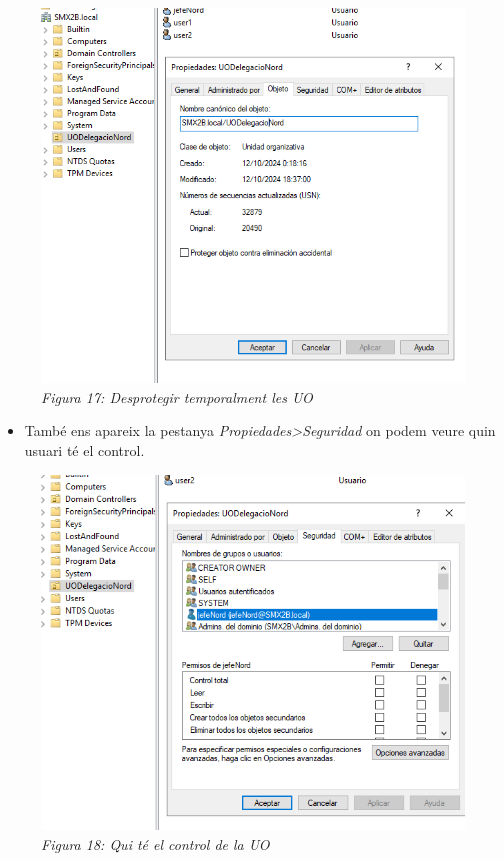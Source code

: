 \documentclass[
  a4paper,
]{article}
\providecommand{\tightlist}{%
  \setlength{\itemsep}{0pt}\setlength{\parskip}{0pt}}
\begin{document}
\begin{figure}
\centering
\includegraphics{png/protegerUO.png}
\caption{\emph{Figura 17: Desprotegir temporalment les UO}}
\end{figure}

\begin{itemize}
\tightlist
\item
  També ens apareix la pestanya \emph{Propiedades\textgreater Seguridad}
  on podem veure quin usuari té el control.
\end{itemize}

\begin{figure}
\centering
\includegraphics{png/seguridaddeUO.png}
\caption{\emph{Figura 18: Qui té el control de la UO}}
\end{figure}
\end{document}
